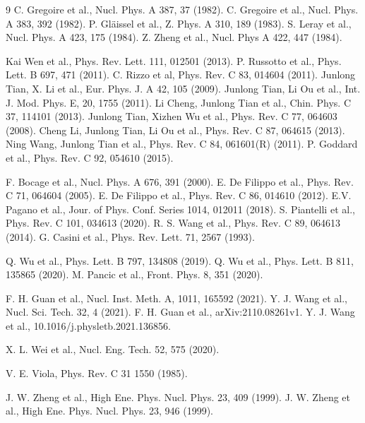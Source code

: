 \documentclass[submitting]{nst}
\begin{document}
\begin{thebibliography} {9}
 C. Gregoire  et al., Nucl. Phys. A 387, 37 (1982).
 C. Gregoire  et al., Nucl. Phys. A 383, 392 (1982).
 P. Gl\"aissel et al., Z. Phys. A  310, 189 (1983).
 S. Leray et al., Nucl. Phys. A 423, 175 (1984).
 Z. Zheng et al., Nucl. Phys A 422, 447 (1984).

 Kai Wen et al., Phys. Rev. Lett. 111, 012501 (2013).
 P. Russotto et al.,  Phys. Lett. B 697, 471 (2011).
 C. Rizzo et al, Phys. Rev. C 83, 014604 (2011).
 Junlong Tian, X. Li et al., Eur. Phys. J. A 42, 105 (2009).
 Junlong Tian, Li Ou et al., Int. J. Mod. Phys. E, 20, 1755 (2011).
 Li Cheng, Junlong Tian et al., Chin. Phys. C 37, 114101 (2013).
 Junlong Tian, Xizhen Wu et al., Phys. Rev. C 77, 064603 (2008).
 Cheng Li, Junlong Tian, Li Ou et al., Phys. Rev. C 87, 064615 (2013).
 Ning Wang, Junlong Tian et al., Phys. Rev. C 84, 061601(R) (2011).
 P. Goddard et al., Phys. Rev. C 92, 054610 (2015).

 F. Bocage et al., Nucl. Phys. A 676, 391 (2000).
 E. De Filippo et al., Phys. Rev. C 71, 064604 (2005).
 E. De Filippo et al., Phys. Rev. C 86, 014610 (2012).
 E.V. Pagano et al., Jour. of Phys. Conf. Series 1014, 012011 (2018). 
 S. Piantelli et al., Phys. Rev. C 101, 034613 (2020).
 R. S. Wang et al., Phys. Rev. C 89, 064613 (2014).
 G. Casini et al., Phys. Rev. Lett. 71, 2567 (1993).

 Q. Wu et al., Phys. Lett. B 797, 134808 (2019).
 Q. Wu et al., Phys. Lett. B 811, 135865 (2020).
 M. Pancic et al.,  Front. Phys. 8, 351 (2020).

 F. H. Guan et al., Nucl. Inst. Meth.  A, 1011, 165592 (2021).
 Y. J. Wang et al., Nucl. Sci. Tech. 32, 4 (2021). 
 F. H. Guan et al.,  arXiv:2110.08261v1.
 Y. J. Wang et al.,  10.1016/j.physletb.2021.136856.

 X. L. Wei et al., Nucl. Eng. Tech. 52, 575 (2020).

 V. E. Viola, Phys. Rev. C 31 1550 (1985).

   J. W. Zheng et al., High Ene. Phys. Nucl. Phys. 23, 409 (1999).
 J. W. Zheng et al., High Ene. Phys. Nucl. Phys. 23, 946 (1999).

    
\end{thebibliography}
\end{document}
